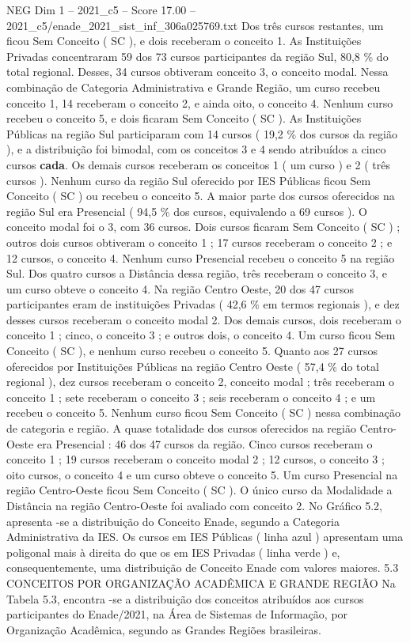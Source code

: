 \begin{textsample}{NEG Dim 1 – 2021\_c5 – Score 17.00 – 2021\_c5/enade\_2021\_sist\_inf\_306a025769.txt}
Dos três cursos restantes, um ficou Sem Conceito ( SC ), e dois receberam o conceito 1.
As Instituições Privadas concentraram 59 dos 73 cursos participantes da região Sul, 80,8 \% do total regional.
Desses, 34 cursos obtiveram conceito 3, o conceito modal.
Nessa combinação de Categoria Administrativa e Grande Região, um curso recebeu conceito 1, 14 receberam o conceito 2, e ainda oito, o conceito 4.
Nenhum curso recebeu o conceito 5, e dois ficaram Sem Conceito ( SC ).
As Instituições Públicas na região Sul participaram com 14 cursos ( 19,2 \% dos cursos da região ), e a distribuição foi bimodal, com os conceitos 3 e 4 sendo atribuídos a cinco cursos \textbf{cada}.
Os demais cursos receberam os conceitos 1 ( um curso ) e 2 ( três cursos ).
Nenhum curso da região Sul oferecido por IES Públicas ficou Sem Conceito ( SC ) ou recebeu o conceito 5.
A maior parte dos cursos oferecidos na região Sul era Presencial ( 94,5 \% dos cursos, equivalendo a 69 cursos ).
O conceito modal foi o 3, com 36 cursos.
Dois cursos ficaram Sem Conceito ( SC ) ; outros dois cursos obtiveram o conceito 1 ; 17 cursos receberam o conceito 2 ; e 12 cursos, o conceito 4.
Nenhum curso Presencial recebeu o conceito 5 na região Sul.
Dos quatro cursos a Distância dessa região, três receberam o conceito 3, e um curso obteve o conceito 4.
Na região Centro Oeste, 20 dos 47 cursos participantes eram de instituições Privadas ( 42,6 \% em termos regionais ), e dez desses cursos receberam o conceito modal 2.
Dos demais cursos, dois receberam o conceito 1 ; cinco, o conceito 3 ; e outros dois, o conceito 4.
Um curso ficou Sem Conceito ( SC ), e nenhum curso recebeu o conceito 5.
Quanto aos 27 cursos oferecidos por Instituições Públicas na região Centro Oeste ( 57,4 \% do total regional ), dez cursos receberam o conceito 2, conceito modal ; três receberam o conceito 1 ; sete receberam o conceito 3 ; seis receberam o conceito 4 ; e um recebeu o conceito 5.
Nenhum curso ficou Sem Conceito ( SC ) nessa combinação de categoria e região.
A quase totalidade dos cursos oferecidos na região Centro-Oeste era Presencial : 46 dos 47 cursos da região.
Cinco cursos receberam o conceito 1 ; 19 cursos receberam o conceito modal 2 ; 12 cursos, o conceito 3 ; oito cursos, o conceito 4 e um curso obteve o conceito 5.
Um curso Presencial na região Centro-Oeste ficou Sem Conceito ( SC ).
O único curso da Modalidade a Distância na região Centro-Oeste foi avaliado com conceito 2.
No Gráfico 5.2, apresenta -se a distribuição do Conceito Enade, segundo a Categoria Administrativa da IES.
Os cursos em IES Públicas ( linha azul ) apresentam uma poligonal mais à direita do que os em IES Privadas ( linha verde ) e, consequentemente, uma distribuição de Conceito Enade com valores maiores. 5.3 CONCEITOS POR ORGANIZAÇÃO ACADÊMICA E GRANDE REGIÃO Na Tabela 5.3, encontra -se a distribuição dos conceitos atribuídos aos cursos participantes do Enade/2021, na Área de Sistemas de Informação, por Organização Acadêmica, segundo as Grandes Regiões brasileiras.

\end{textsample}
